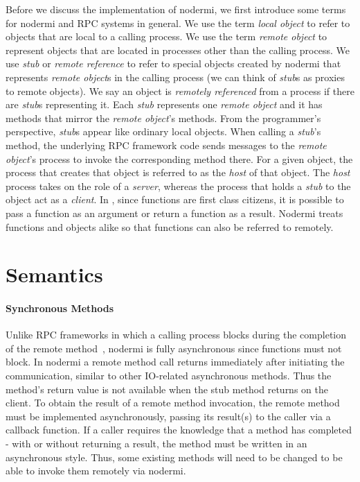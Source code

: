 Before we discuss the implementation of nodermi,
we first introduce some terms for nodermi and
RPC systems in general.
We use the term \emph{local object}
to refer to objects that are local to a calling process.
We use the term \emph{remote object} to represent objects that are
located in processes other than the calling process.
We use \emph{stub} or \emph{remote reference} to refer to special objects created
by nodermi that represents \emph{remote object}s in the calling process
(we can think of \emph{stub}s as proxies to remote objects).
We say an object is \emph{remotely referenced} from a process
if there are \emph{stub}s representing it.
Each \emph{stub} represents one \emph{remote object} and
it has methods that mirror the \emph{remote object}'s methods.
From the programmer's perspective,
\emph{stub}s appear like ordinary local objects.
When calling a \emph{stub}'s method, the underlying
RPC framework code sends messages to the \emph{remote object}'s process
to invoke the corresponding method there.
For a given object, the process that creates that object is referred
to as the \emph{host} of that object. The \emph{host} process takes on the
role of a \emph{server}, whereas the process that holds a \emph{stub} 
to the object act as a \emph{client}.
In \js{}, since functions are first class citizens, it is possible
to pass a function as an argument or return a function as a result.
Nodermi treats functions and objects alike so that functions can also be
referred to remotely.

\section{Semantics}

\nodermiexamplefig{}

\paragraph{Synchronous Methods}
Unlike RPC frameworks in which a calling process blocks during the
completion of the remote method~\cite{birrell1984implementing},
nodermi is fully asynchronous since \js{} functions must not block.
In nodermi a remote method call returns immediately after initiating the communication,
similar to other IO-related asynchronous methods.
Thus the method's return value is not available when the stub method returns on the client.
To obtain the result of a remote method invocation,
the remote method must be implemented asynchronously,
passing its result(s) to the caller via a callback function.
If a caller requires the knowledge that a method has completed - with or without
returning a result, the method must be written in an asynchronous style.
Thus, some existing methods will need to be changed to be able to invoke them 
remotely via nodermi.

